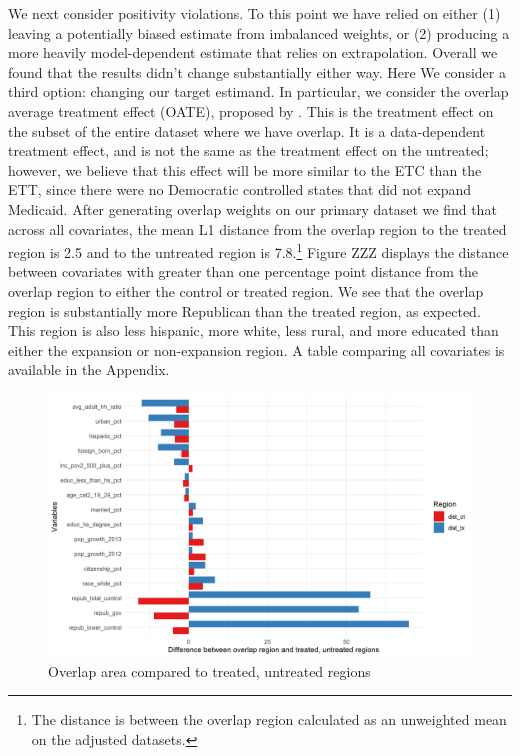 \documentclass[12pt]{article}
\begin{document}
We next consider positivity violations. To this point we have relied on either (1) leaving a potentially biased estimate from imbalanced weights, or (2) producing a more heavily model-dependent estimate that relies on extrapolation. Overall we found that the results didn't change substantially either way. Here We consider a third option: changing our target estimand. In particular, we consider the overlap average treatment effect (OATE), proposed by \cite{li2018balancing}. This is the treatment effect on the subset of the entire dataset where we have overlap. It is a data-dependent treatment effect, and is not the same as the treatment effect on the untreated; however, we believe that this effect will be more similar to the ETC than the ETT, since there were no Democratic controlled states that did not expand Medicaid. After generating overlap weights on our primary dataset we find that across all covariates, the mean L1 distance from the overlap region to the treated region is 2.5 and to the untreated region is 7.8.\footnote{The distance is between the overlap region calculated as an unweighted mean on the adjusted datasets.} Figure ZZZ displays the distance between covariates with greater than one percentage point distance from the overlap region to either the control or treated region. We see that the overlap region is substantially more Republican than the treated region, as expected. This region is also less hispanic, more white, less rural, and more educated than either the expansion or non-expansion region. A table comparing all covariates is available in the Appendix.

\begin{figure}[]
\begin{center}
    \includegraphics[scale=0.6]{01_Plots/oate-imbalances.png}
    \caption{Overlap area compared to treated, untreated regions}
    \label{oateimbalance}
\end{center}
\end{figure}
\end{document}
